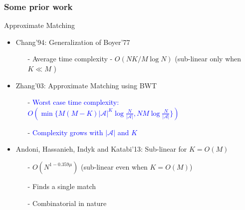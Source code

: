 \documentclass[10pt,xcolor=table]{beamer}
\newcommand{\mc}{\mathcal}
\begin{document}
\begin{frame} \frametitle{Some prior work}
	\vspace{-0.2cm}
	\begin{block}{\alert{Approximate Matching}}
		
	 	\begin{itemize}
	 		\item {Chang'94}: Generalization of Boyer'77
	 		\begin{itemize}
	 			\item[-] Average time complexity - $O(NK/M \log N)$ (sub-linear only when $K \ll M$ )
	 		\end{itemize}
	 		
	 		\item {Zhang'03}: Approximate Matching using BWT
	 			\begin{itemize}
	 				\item[-] \textcolor{blue}{Worst case time complexity: $O(\min\{M(M-K){|\mc{A}|}^K\log \frac{N}{|\mc{A}|} , NM \log \frac{N}{|\mc{A}|}\})$}
	 				\item[-] \textcolor{blue}{Complexity grows with $|\mc{A}|$ and $K$}
	 			\end{itemize}
	 		\pause	
	 		\item {Andoni, Hassanieh, Indyk and Katabi'13}: Sub-linear for $K = O(M)$
	 		\begin{itemize}
                \item[-] \textcolor[rgb]{0.00,0.00,1.00}{$O\left(N^{1-0.359\mu}\right)$ (sub-linear even when $K = O(M)$)}
                \item[-] Finds a single match
	 			\item[-] Combinatorial in nature
	 		\end{itemize}
	 	\end{itemize}
	 	
	 \end{block}
\end{frame}
	
\end{document}
